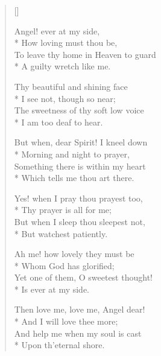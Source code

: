 \newHymn


\begin{verse}[\versewidth]
\begin{altverse}
 Angel! ever at my side,\\*
How loving must thou be,\\
To leave thy home in Heaven to guard\\*
A guilty wretch like me.
\end{altverse}

\begin{altverse}
Thy beautiful and shining face\\*
I see not, though so near;\\
The sweetness of thy soft low voice\\*
I am too deaf to hear.
\end{altverse}

\begin{altverse}
But when, dear Spirit! I kneel down\\*
Morning and night to prayer,\\
Something there is within my heart\\*
Which tells me thou art there.
\end{altverse}

\begin{altverse}
Yes! when I pray thou prayest too,\\*
Thy prayer is all for me;\\
But when I sleep thou sleepest not,\\*
But watchest patiently.
\end{altverse}

\begin{altverse}
Ah me! how lovely they must be\\*
Whom God has glorified;\\
Yet one of them, O sweetest thought!\\*
Is ever at my side.
\end{altverse}

\begin{altverse}
Then love me, love me, Angel dear!\\*
And I will love thee more;\\
And help me when my soul is cast\\*
Upon th'eternal shore.
\end{altverse}

\end{verse}


